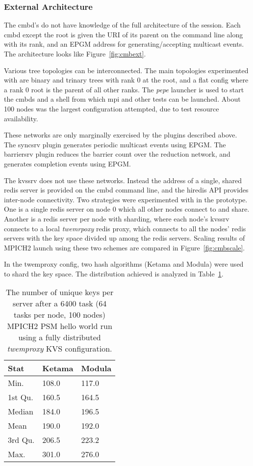 \subsubsection {External Architecture}
The cmbd's do not have knowledge of the full architecture of the session.
Each cmbd except the root is given the URI of its parent on the command line
along with its rank, and an EPGM address for generating/accepting multicast
events.  The architecture looks like Figure~\ref{fig:cmbext}.

Various tree topologies can be interconnected.
The main topologies experimented with are binary and trinary trees with
rank 0 at the root, and a flat config where a rank 0 root is the parent
of all other ranks.  
The {\em pepe} launcher is used to start the cmbds and a shell from which
mpi and other tests can be launched.
About 100 nodes was the largest configuration attempted,
due to test resource availability.

These networks are only marginally exercised by the plugins described above.
The syncsrv plugin generates periodic multicast events using EPGM.
The barriersrv plugin reduces the barrier count over the reduction network,
and generates completion events using EPGM.

The kvssrv does not use these networks.  Instead the address of a single,
shared redis server is provided on the cmbd command line, and the hiredis
API provides inter-node connectivity.  Two strategies were experimented
with in the prototype.  One is a single redis server on node 0 which
all other nodes connect to and share.  Another is a redis server per node
with sharding, where each node's kvssrv connects to a local {\em twemrpoxy}
redis proxy, which connects to all the nodes' redis servers with the key
space divided up among the redis servers.  Scaling results of MPICH2
launch using these two schemes are compared in Figure~\ref{fig:cmbscale}.

In the twemproxy config, two hash algorithms (Ketama and Modula) were
used to shard the key space.  The distribution achieved is analyzed in
Table~\ref{tab:keydist}.

\begin{table}
\centering
\begin{tabular}{|l|l|l|}\hline
\textbf{Stat} & \textbf{Ketama} & \textbf{Modula} \\
\hline
 Min.   &108.0   &117.0\\
 1st Qu.&160.5   &164.5\\
 Median &184.0   &196.5\\
 Mean   &190.0   &192.0\\
 3rd Qu.&206.5   &223.2\\
 Max.   &301.0   &276.0\\
\hline
\end{tabular}
\caption{The number of unique keys per server after a 6400 task (64 tasks per
node, 100 nodes) MPICH2 PSM
hello world run using a fully distributed {\em twemproxy} KVS configuration.}
\label{tab:keydist}
\end{table}

